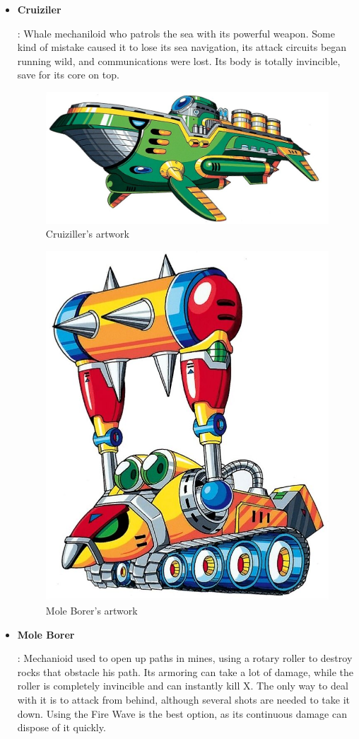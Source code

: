 \begin{itemize}
		\item
		 \hypertarget{miniboss:Cruiziler}{\textbf{Cruiziler}}: Whale mechaniloid who patrols the sea with its powerful weapon. Some kind of mistake caused it to lose its sea navigation, its attack circuits began running wild, and communications were lost. Its body is totally invincible, save for its core on top.
		\begin{figure}[htp]
			\centering
			\includegraphics[width=0.4\linewidth]{figures/X1/Enemies/Cruiziller.jpg}
			\caption{Cruiziller's artwork}
		\end{figure}
		
		\begin{figure}[htp]
		\centering
		\includegraphics[width=0.3\linewidth]{figures/X1/Enemies/MoleBorer.jpg}
		\caption{Mole Borer's artwork}
		\end{figure}
	
		\item \hypertarget{miniboss:Mole_Borer}{\textbf{Mole Borer}}:
		Mechanioid used to open up paths in mines, using a 
		rotary roller to destroy rocks that obstacle his path. Its armoring can take a lot of damage, while the roller is completely invincible and can instantly kill X. The only way to deal with it is to attack from behind, although several shots are needed to take it down. Using the Fire Wave is the best option, as its continuous damage can dispose of it quickly.
	

\end{itemize}

